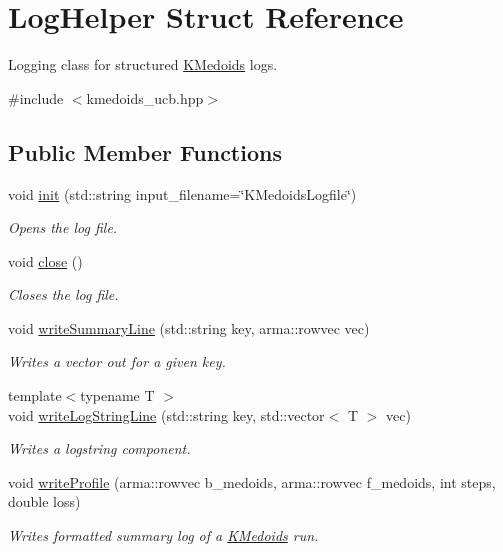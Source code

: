 \hypertarget{structLogHelper}{}\section{Log\+Helper Struct Reference}
\label{structLogHelper}


Logging class for structured \hyperlink{classKMedoids}{K\+Medoids} logs.  




{\ttfamily \#include $<$kmedoids\+\_\+ucb.\+hpp$>$}

\subsection*{Public Member Functions}
\begin{DoxyCompactItemize}
\item 
void \hyperlink{structLogHelper_a8bf957fb897ae5b548264f2f614879c5}{init} (std\+::string input\+\_\+filename=\char`\"{}K\+Medoids\+Logfile\char`\"{})
\begin{DoxyCompactList}\small\item\em Opens the log file. \end{DoxyCompactList}\item 
void \hyperlink{structLogHelper_a4624149f53c4577d0565f761c155d800}{close} ()
\begin{DoxyCompactList}\small\item\em Closes the log file. \end{DoxyCompactList}\item 
void \hyperlink{structLogHelper_a5b1a8ff2ae2ce6e3293e3b34085e3b86}{write\+Summary\+Line} (std\+::string key, arma\+::rowvec vec)
\begin{DoxyCompactList}\small\item\em Writes a vector out for a given key. \end{DoxyCompactList}\item 
{\footnotesize template$<$typename T $>$ }\\void \hyperlink{structLogHelper_ad1bb80fa2bd8b1dfcd944ea19c4e8e06}{write\+Log\+String\+Line} (std\+::string key, std\+::vector$<$ T $>$ vec)
\begin{DoxyCompactList}\small\item\em Writes a logstring component. \end{DoxyCompactList}\item 
void \hyperlink{structLogHelper_a15b3f49bf98956a0585f036801e25dbe}{write\+Profile} (arma\+::rowvec b\+\_\+medoids, arma\+::rowvec f\+\_\+medoids, int steps, double loss)
\begin{DoxyCompactList}\small\item\em Writes formatted summary log of a \hyperlink{classKMedoids}{K\+Medoids} run. \end{DoxyCompactList}\end{DoxyCompactItemize}
